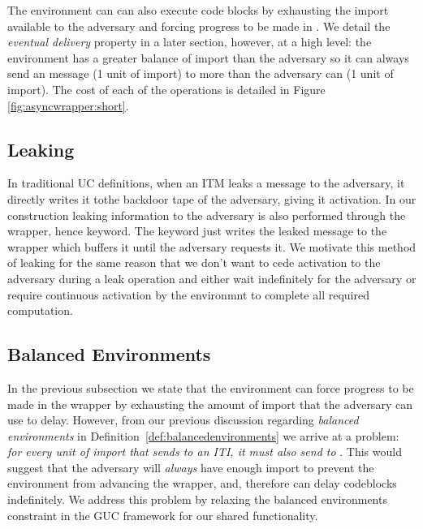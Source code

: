 The environment can can also execute code blocks by exhausting the import available to the adversary and forcing progress to be made in \Wasync.
We detail the {\em eventual delivery} property in a later section, however, at a high level: the environment has a greater balance of import than the adversary so it can always send an \Advance message (1 unit of import) to \Wasync more than the adversary can \Delay (1 unit of import).
The cost of each of the operations is detailed in Figure \ref{fig:asyncwrapper:short}.

\subsection{Leaking}
In traditional UC definitions, when an ITM leaks a message to the adversary, it directly writes it tothe backdoor tape of the adversary, giving it activation.
In our construction leaking information to the adversary is also performed through the wrapper, hence \Leak keyword.
The \Leak keyword just writes the leaked message to the wrapper which buffers it until the adversary requests it.
We motivate this method of leaking for the same reason that we don't want to cede activation to the adversary during a leak operation and either wait indefinitely for the adversary or require continuous activation by the environmnt to complete all required computation.

\subsection{Balanced Environments}
In the previous subsection we state that the environment can force progress to be made in the wrapper by exhausting the amount of import that the adversary can use to delay.
However, from our previous discussion regarding \textit{balanced environments} in Definition~\ref{def:balancedenvironments} we arrive at a problem: \textit{for every unit of import that \Environment sends to an ITI, it must also send to \Adversary}.
This would suggest that the adversary will \textit{always} have enough import to prevent the environment from advancing the wrapper, and, therefore \Adversary can delay codeblocks indefinitely.
We address this problem by relaxing the balanced environments constraint in the GUC framework for our shared functionality.

